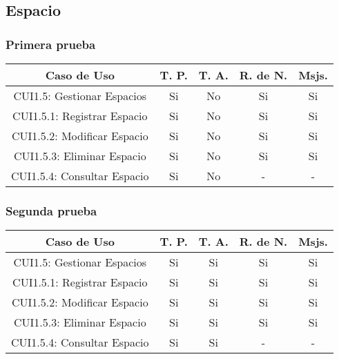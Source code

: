 \subsection{Espacio}

\subsubsection{Primera prueba}
\begin{center}
	\begin{tabular}{ |c|c|c|c|c| } 
		\hline
		Caso de Uso & T. P. & T. A. & R. de N. & Msjs. \\
		\hline 
		CUI1.5: Gestionar Espacios & Si & No & Si & Si \\ 
		CUI1.5.1: Registrar Espacio & Si & No & Si & Si \\ 
		CUI1.5.2: Modificar Espacio & Si & No & Si & Si \\ 
		CUI1.5.3: Eliminar Espacio & Si & No & Si & Si \\ 
		CUI1.5.4: Consultar Espacio & Si & No & - & - \\ 
		\hline
	\end{tabular}
\end{center}

\subsubsection{Segunda prueba}
\begin{center}
	\begin{tabular}{ |c|c|c|c|c| } 
		\hline
		Caso de Uso & T. P. & T. A. & R. de N. & Msjs. \\
		\hline 
		CUI1.5: Gestionar Espacios & Si & Si & Si & Si \\ 
		CUI1.5.1: Registrar Espacio & Si & Si & Si & Si \\ 
		CUI1.5.2: Modificar Espacio & Si & Si & Si & Si \\ 
		CUI1.5.3: Eliminar Espacio & Si & Si & Si & Si \\ 
		CUI1.5.4: Consultar Espacio & Si & Si & - & - \\ 
		\hline
	\end{tabular}
\end{center}
